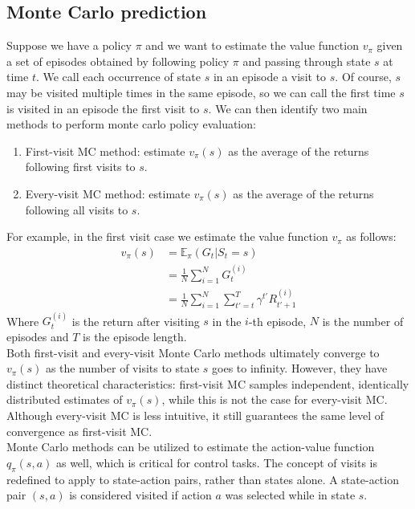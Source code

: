 \subsection{Monte Carlo prediction}
Suppose we have a policy $\pi$ and we want to estimate the value function $v_{\pi}$ given a set of episodes obtained by following policy $\pi$ and passing through state $s$ at time $t$. We call each occurrence of state $s$ in an episode a visit to $s$. Of course, $s$ may be visited multiple times in the same episode, so we can call the first time $s$ is visited in an episode the first visit to $s$. We can then identify two main methods to perform monte carlo policy evaluation:
\begin{enumerate}
    \item First-visit MC method: estimate $v_{\pi}(s)$ as the average of the returns following first visits to $s$.
    \item Every-visit MC method: estimate $v_{\pi}(s)$ as the average of the returns following all visits to $s$.
\end{enumerate}
For example, in the first visit case we estimate the value function $v_{\pi}$ as follows:
\begin{equation}
    \begin{split}
    v_{\pi}(s) & = \mathds{E}_{\pi}(G_t | S_t = s)\\
    & = \frac{1}{N} \sum_{i=1}^N G_t^{(i)}\\
    & = \frac{1}{N} \sum_{i=1}^N \sum_{t'=t}^{T} \gamma^{t'} R_{t'+1}^{(i)}
    \end{split}
    \label{mc-prediction}
\end{equation}
Where $G_t^{(i)}$ is the return after visiting $s$ in the $i$-th episode, $N$ is the number of episodes and $T$ is the episode length.\\
Both first-visit and every-visit Monte Carlo methods ultimately converge to $v_{\pi}(s)$ as the number of visits to state $s$ goes to infinity. However, they have distinct theoretical characteristics: first-visit MC samples independent, identically distributed estimates of $v_{\pi}(s)$, while this is not the case for every-visit MC. Although every-visit MC is less intuitive, it still guarantees the same level of convergence as first-visit MC.\\
Monte Carlo methods can be utilized to estimate the action-value function $q_{\pi}(s, a)$ as well, which is critical for control tasks. The concept of visits is redefined to apply to state-action pairs, rather than states alone. A state-action pair $(s, a)$ is considered visited if action $a$ was selected while in state $s$.

